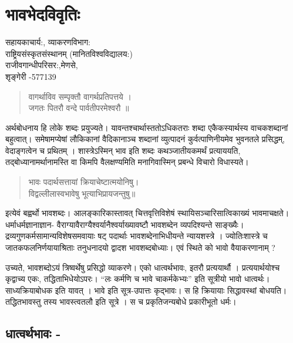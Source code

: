 \chapter{भावभेदविवृतिः}

\begin{center}
\smallskip

सहायकाचार्य:, व्याकरणविभाग:\\
राष्ट्रियसंस्कृतसंस्थानम् (मानितविश्वविद्यालय:)\\
राजीवगान्धीपरिसर:,मेणसे,\\ 
शृङ्गेरी -577139
\end{center}

\begin{verse}
वागर्थाविव सम्पृक्तौ वागर्थप्रतिपत्तये ।\\
जगतः पितरौ वन्दे पार्वतीपरमेश्वरौ ॥
\end{verse}
अर्थबोधनाय हि लोके शब्दः प्रयुज्यते। यावन्तश्चार्थास्ततोऽधिकतराः शब्दा एकैकस्यार्थस्य वाचकशब्दानां बहुत्वात्। समेषामप्येषां लौकिकानां वैदिकानाञ्च शब्दानां व्युत्पादनं कुर्वत्पाणिनीयमेव भुवनतले प्रसिद्धम्, वेदाङ्गत्वेन च प्रथितम् । शास्त्रेऽस्मिन् भाव इति शब्दः कथञ्जातीयकमर्थं प्रत्याययति, तद्बोध्यानामर्थानामस्ति वा किमपि वैलक्षण्यमिति मनागिवास्मिन् प्रबन्धे विचारो विधास्यते।
\begin{verse}
भावः पदार्थसत्तायां क्रियाचेष्टात्मयोनिषु।\\
विद्वल्लीलास्वभावेषु भूत्याभिप्रायजन्तुषु॥
\end{verse}
इत्येवं बह्वर्थो भावशब्दः। आलङ्कारिकास्तावत् चित्तवृत्तिविशेषं स्थायिसञ्चारिसात्विकाख्यं भावमाचक्षते। धर्माधर्मज्ञानाज्ञान- वैराग्यावैराग्यैश्वर्यानैश्वर्याख्यावष्टौ भावशब्देन  व्यपदिश्यन्ते  साङ्ख्यैः। द्रव्यगुणकर्मसामान्यविशेषसमवायाः षट् पदार्थाः भावशब्देनाभिधीयन्ते न्यायशस्त्रे । ज्योतिःशास्त्रे च जातकफलनिर्णयायाश्रिताः तनुधनादयो द्वादश भावशब्दबोध्याः। एवं स्थिते को भावो वैयाकरणानाम् ?

उच्यते, भावशब्दोऽयं त्रिष्वर्थेषु प्रसिद्धो व्याकरणे। एको धात्वर्थभावः, इतरौ प्रत्ययार्थौ । प्रत्ययार्थयोश्च कृद्वाच्य एकः, तद्धिताभिधेयोऽपरः। “लः कर्मणि च भावे चाकर्मकेभ्यः” इति सूत्रीयो भावो धात्वर्थः। साध्यक्रियाबोधक इति यावत् । भावे इति सूत्र-उपात्तः कृद्भावः। स हि क्रियायाः सिद्धावस्थां बोधयति। तद्धितभावस्तु तस्य भावस्त्वतलौ इति सूत्रे । स च प्रकृतिजन्यबोधे प्रकारीभूतो धर्मः।

\section*{धात्वर्थभावः -} 

